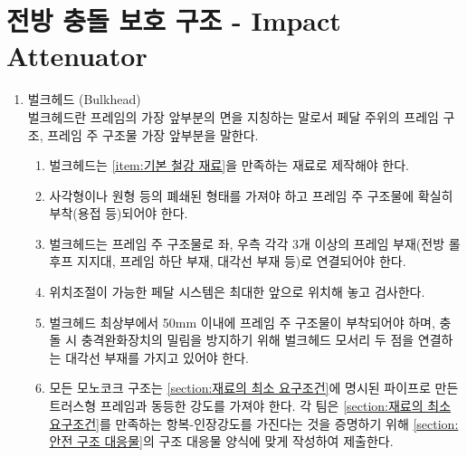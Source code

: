 \documentclass[final,a4paper,10pt]{report}
\begin{document}
\section{전방 충돌 보호 구조 - Impact Attenuator}\label{rule:formula-technical.impact-attenuator}
\begin{enumerate}
  \item\label{rule:formula-technical.impact-attenuator.bulkhead} 벌크헤드 (Bulkhead)\\ \label{item:벌크헤드}
    벌크헤드란 프레임의 가장 앞부분의 면을 지칭하는 말로서 페달 주위의 프레임 구조, 프레임 주 구조물 가장 앞부분을 말한다.
    \begin{enumerate}
      \item\label{rule:formula-technical.impact-attenuator.bulkhead.material-compliance} 벌크헤드는 \ref{item:기본 철강 재료}을 만족하는 재료로 제작해야 한다.
      \item\label{rule:formula-technical.impact-attenuator.bulkhead.closed-shape-frame-weld} 사각형이나 원형 등의 폐쇄된 형태를 가져야 하고 프레임 주 구조물에 확실히 부착(용접 등)되어야 한다.
      \item\label{rule:formula-technical.impact-attenuator.bulkhead.min-3members-each-side} 벌크헤드는 프레임 주 구조물로 좌, 우측 각각 3개 이상의 프레임 부재(전방 롤 후프 지지대, 프레임 하단 부재, 대각선 부재 등)로 연결되어야 한다.
      \item\label{rule:formula-technical.impact-attenuator.bulkhead.pedal-position-for-check} 위치조절이 가능한 페달 시스템은 최대한 앞으로 위치해 놓고 검사한다.
      \item\label{rule:formula-technical.impact-attenuator.bulkhead.top-attachment-diagonal-brace} 벌크헤드 최상부에서 50mm 이내에 프레임 주 구조물이 부착되어야 하며, 충돌 시 충격완화장치의 밀림을 방지하기 위해 벌크헤드 모서리 두 점을 연결하는 대각선 부재를 가지고 있어야 한다.
      \item\label{rule:formula-technical.impact-attenuator.bulkhead.monocoque-equivalent-strength} 모든 모노코크 구조는 \ref{section:재료의 최소 요구조건}에 명시된 파이프로 만든 트러스형 프레임과 동등한 강도를 가져야 한다. 각 팀은 \ref{section:재료의 최소 요구조건}를 만족하는 항복-인장강도를 가진다는 것을 증명하기 위해 \ref{section:안전 구조 대응물}의 구조 대응물 양식에 맞게 작성하여 제출한다. \label{item:모노코크 벌크헤드}
    \end{enumerate}


\end{enumerate}
\end{document}
